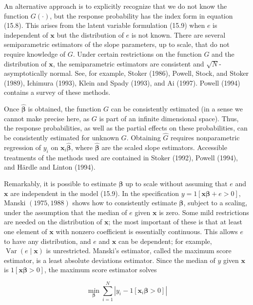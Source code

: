 \documentclass[10pt]{article}
\begin{document}
An alternative approach is to explicitly recognize that we do not know the function $G(\cdot)$, but the response probability has the index form in equation (15.8). This arises from the latent variable formulation (15.9) when $e$ is independent of $\mathbf{x}$ but the distribution of $e$ is not known. There are several semiparametric estimators of the slope parameters, up to scale, that do not require knowledge of $G$. Under certain restrictions on the function $G$ and the distribution of $\mathbf{x}$, the semiparametric estimators are consistent and $\sqrt{N}$-asymptotically normal. See, for example, Stoker (1986), Powell, Stock, and Stoker (1989), Ichimura (1993), Klein and Spady (1993), and Ai (1997). Powell (1994) contains a survey of these methods.

Once $\hat{\boldsymbol{\beta}}$ is obtained, the function $G$ can be consistently estimated (in a sense we cannot make precise here, as $G$ is part of an infinite dimensional space). Thus, the response probabilities, as well as the partial effects on these probabilities, can be consistently estimated for unknown $G$. Obtaining $\hat{G}$ requires nonparametric regression of $y_{i}$ on $\mathbf{x}_{i} \hat{\boldsymbol{\beta}}$, where $\hat{\boldsymbol{\beta}}$ are the scaled slope estimators. Accessible treatments of the methods used are contained in Stoker (1992), Powell (1994), and Härdle and Linton (1994).

Remarkably, it is possible to estimate $\boldsymbol{\beta}$ up to scale without assuming that $e$ and $\mathbf{x}$ are independent in the model (15.9). In the specification $y=1[\mathbf{x} \boldsymbol{\beta}+e>0]$, Manski $(1975,1988)$ shows how to consistently estimate $\boldsymbol{\beta}$, subject to a scaling, under the assumption that the median of $e$ given $\mathbf{x}$ is zero. Some mild restrictions are needed on the distribution of $\mathbf{x}$; the most important of these is that at least one element of $\mathbf{x}$ with nonzero coefficient is essentially continuous. This allows $e$ to have any distribution, and $e$ and $\mathbf{x}$ can be dependent; for example, $\operatorname{Var}(e \mid \mathbf{x})$ is unrestricted. Manski's estimator, called the maximum score estimator, is a least absolute deviations estimator. Since the median of $y$ given $\mathbf{x}$ is $1[\mathbf{x} \boldsymbol{\beta}>0]$, the maximum score estimator solves

$$
\min _{\boldsymbol{\beta}} \sum_{i=1}^{N}\left|y_{i}-1\left[\mathbf{x}_{i} \boldsymbol{\beta}>0\right]\right|
$$
\end{document}
